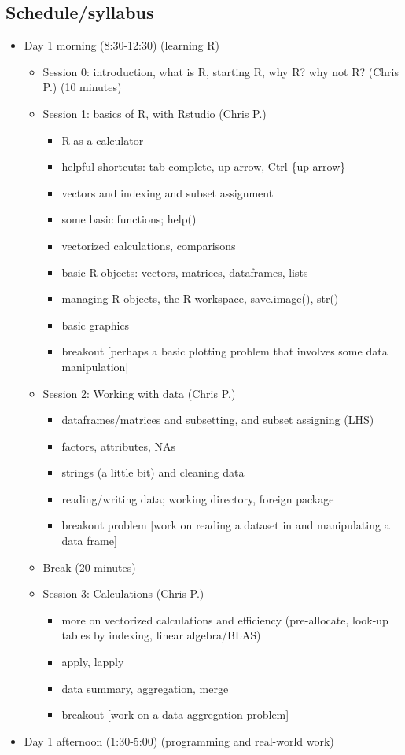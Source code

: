 \documentclass[12pt]{article}\usepackage{graphicx, color}
\begin{document}
\subsection*{Schedule/syllabus}
\begin{itemize}
\item Day 1 morning (8:30-12:30) (learning R)

\begin{itemize}
\item Session 0: introduction, what is R, starting R, why R? why not R?
(Chris P.) (10 minutes)
\item Session 1: basics of R, with Rstudio (Chris P.)

\begin{itemize}
\item R as a calculator
\item helpful shortcuts: tab-complete, up arrow, Ctrl-\{up arrow\}
\item vectors and indexing and subset assignment
\item some basic functions; help()
\item vectorized calculations, comparisons
\item basic R objects: vectors, matrices, dataframes, lists
\item managing R objects, the R workspace, save.image(), str()
\item basic graphics
\item breakout {[}perhaps a basic plotting problem that involves some data
manipulation{]} 
\end{itemize}
\item Session 2: Working with data (Chris P.)

\begin{itemize}
\item dataframes/matrices and subsetting, and subset assigning (LHS)
\item factors, attributes, NAs
\item strings (a little bit) and cleaning data
\item reading/writing data; working directory, foreign package
\item breakout problem {[}work on reading a dataset in and manipulating
a data frame{]}
\end{itemize}
\item Break (20 minutes)
\item Session 3: Calculations (Chris P.)

\begin{itemize}
\item more on vectorized calculations and efficiency (pre-allocate, look-up
tables by indexing, linear algebra/BLAS)
\item apply, lapply
\item data summary, aggregation, merge
\item breakout {[}work on a data aggregation problem{]}
\end{itemize}
\end{itemize}
\item Day 1 afternoon (1:30-5:00) (programming and real-world work)


\end{itemize}
\end{document}
